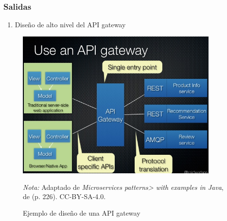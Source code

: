 \subsubsection*{Salidas}
\begin{enumerate}
  \item Diseño de alto nivel del API gateway
\end{enumerate}

\vspace{1em}
\begin{figure}[H]
  \caption{Ejemplo de diseño de una API gateway}
  \begin{center}
    \includegraphics[width=0.90\textwidth]{src/assets/metodologia/apigateway}
    \label{fig:api_gateway}
  \end{center}
  \textit{Nota:} Adaptado de \textit{Microservices patterns> with examples in Java}, de \cite{richardson2018microservices}
  (p. 226). CC-BY-SA-4.0.
\end{figure}

